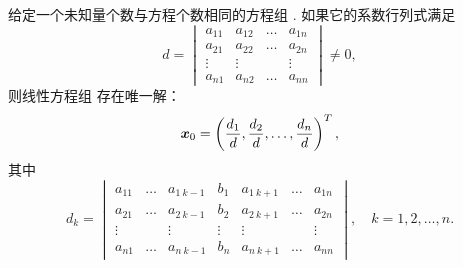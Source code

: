 \begin{theorem}[克拉默法则]\label{theorem:线性方程组.克拉默法则}
给定一个未知量个数与方程个数相同的方程组 .
如果它的系数行列式满足\begin{equation*}
	d
	=\begin{vmatrix}
		a_{11} & a_{12} & \dots & a_{1n} \\
		a_{21} & a_{22} & \dots & a_{2n} \\
		\vdots & \vdots & & \vdots \\
		a_{n1} & a_{n2} & \dots & a_{nn}
	\end{vmatrix}
	\neq 0,
\end{equation*}
则线性方程组  存在唯一解：
\begin{equation}
	\boldsymbol{x}_0
	= \left( \frac{d_1}{d},\frac{d_2}{d},\dotsc,\frac{d_n}{d} \right)^T,
\end{equation}
其中\begin{equation}
	d_k
	= \begin{vmatrix}
		a_{11} & \dots & a_{1\ k-1} & b_1 & a_{1\ k+1} & \dots & a_{1n} \\
		a_{21} & \dots & a_{2\ k-1} & b_2 & a_{2\ k+1} & \dots & a_{2n} \\
		\vdots & & \vdots & \vdots & \vdots & & \vdots \\
		a_{n1} & \dots & a_{n\ k-1} & b_n & a_{n\ k+1} & \dots & a_{nn}
	\end{vmatrix},
	\quad k=1,2,\dotsc,n.
\end{equation}

\end{theorem}
